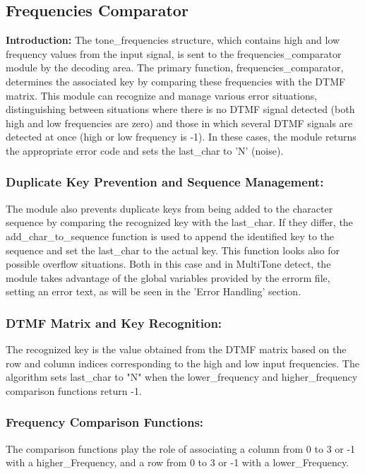 \documentclass{cce2014-design}
\begin{document}
{  \subsection{Frequencies Comparator}
  {
	  \textbf{Introduction:}
	  The tone\_frequencies structure, which contains high and low
	  frequency values from the input signal, is sent to the
	  frequencies\_comparator
	  module by the decoding area. The primary function,
	  frequencies\_comparator,
	  determines the associated key by comparing these frequencies with the
	  DTMF
	  matrix. This module can recognize and manage various error
	  situations,
	  distinguishing between situations where there is no DTMF signal
	  detected (both
	  high and low frequencies are zero) and those in which several DTMF
	  signals are
	  detected at once (high or low frequency is -1). In these cases, the
	  module
	  returns the appropriate error code and sets the last\_char to 'N'
	  (noise).

	  \subsubsection{Duplicate Key Prevention and Sequence Management:}
	  The module also prevents duplicate keys from being added to the
	  character sequence by comparing the recognized key with the
	  last\_char. If they
	  differ, the add\_char\_to\_sequence function is used to append the
	  identified
	  key to the sequence and set the last\_char to the actual key. This
	  function
	  looks also for possible overflow situations. Both in this case and in
	  MultiTone
	  detect, the module takes advantage of the global variables provided
	  by the
	  errorm file, setting an error text, as will be seen in the 'Error
	  Handling'
	  section.

	  \subsubsection{DTMF Matrix and Key Recognition:}
	  The recognized key is the value obtained from the DTMF matrix
	  based on the row and column indices corresponding to the high and low
	  input
	  frequencies. The algorithm sets last\_char to "N" when the
	  lower\_frequency and
	  higher\_frequency comparison functions return -1.

	  \subsubsection{Frequency Comparison Functions:}
	  The comparison functions play the role of associating a column
	  from 0 to 3 or -1 with a higher\_Frequency, and a row from 0 to 3 or
	  -1 with a
	  lower\_Frequency.

}}
\end{document}
